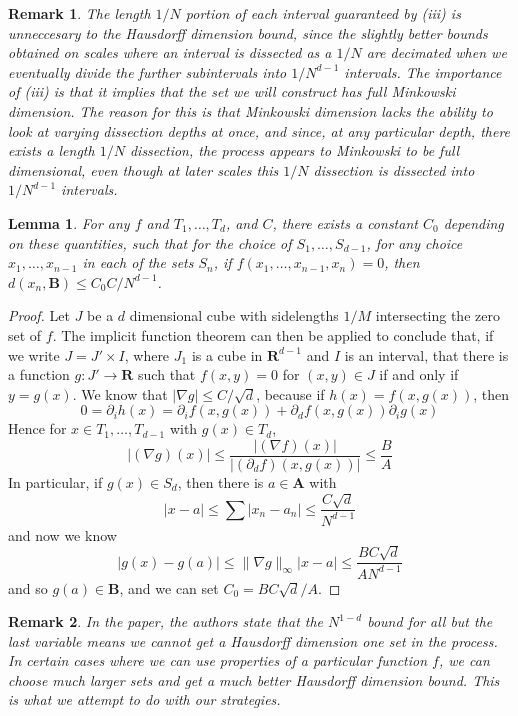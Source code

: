 \documentclass{report}
\theoremstyle{plain}
\newtheorem{lemma}{Lemma}
\theoremstyle{plain}
\newtheorem*{remark}{Remark}
\begin{document}
\begin{remark}
    The length $1/N$ portion of each interval guaranteed by (iii) is unneccesary to the Hausdorff dimension bound, since the slightly better bounds obtained on scales where an interval is dissected as a $1/N$ are decimated when we eventually divide the further subintervals into $1/N^{d-1}$ intervals. The importance of (iii) is that it implies that the set we will construct has full {\it Minkowski dimension}. The reason for this is that Minkowski dimension lacks the ability to look at varying dissection depths at once, and since, at any particular depth, there exists a length $1/N$ dissection, the process appears to Minkowski to be full dimensional, even though at later scales this $1/N$ dissection is dissected into $1/N^{d-1}$ intervals.
\end{remark}

\begin{lemma}
    For any $f$ and $T_1, \dots, T_d$, and $C$, there exists a constant $C_0$ depending on these quantities, such that for the choice of $S_1, \dots, S_{d-1}$, for any choice $x_1, \dots, x_{n-1}$ in each of the sets $S_n$, if $f(x_1, \dots, x_{n-1}, x_n) = 0$, then $d(x_n, \mathbf{B}) \leq C_0C/N^{d-1}$.
\end{lemma}
\begin{proof}
    Let $J$ be a $d$ dimensional cube with sidelengths $1/M$ intersecting the zero set of $f$. The implicit function theorem can then be applied to conclude that, if we write $J = J' \times I$, where $J_1$ is a cube in $\mathbf{R}^{d-1}$ and $I$ is an interval, that there is a function $g: J' \to \mathbf{R}$ such that $f(x,y) = 0$ for $(x,y) \in J$ if and only if $y = g(x)$. We know that $|\nabla g| \leq C/\sqrt{d}$, because if $h(x) = f(x,g(x))$, then
    \[ 0 = \partial_i h(x) = \partial_i f (x,g(x)) + \partial_d f (x, g(x)) \partial_i g(x) \]
    Hence for $x \in T_1, \dots, T_{d-1}$ with $g(x) \in T_d$,
    \[ |(\nabla g)(x)| \leq \frac{|(\nabla f)(x)|}{|(\partial_d f)(x,g(x))|} \leq \frac{B}{A} \]
    In particular, if $g(x) \in S_d$, then there is $a \in \mathbf{A}$ with
    \[ |x-a| \leq \sum |x_n - a_n| \leq \frac{C \sqrt{d}}{N^{d-1}} \]
    and now we know
    \[ |g(x) - g(a)| \leq \| \nabla g \|_\infty |x - a| \leq \frac{BC \sqrt{d}}{A N^{d-1}} \]
    and so $g(a) \in \mathbf{B}$, and we can set $C_0 = BC \sqrt{d}/A$.
\end{proof}

\begin{remark}
    In the paper, the authors state that the $N^{1-d}$ bound for all but the last variable means we cannot get a Hausdorff dimension one set in the process. In certain cases where we can use properties of a particular function $f$, we can choose much larger sets and get a much better Hausdorff dimension bound. This is what we attempt to do with our strategies.
\end{remark}
\end{document}
